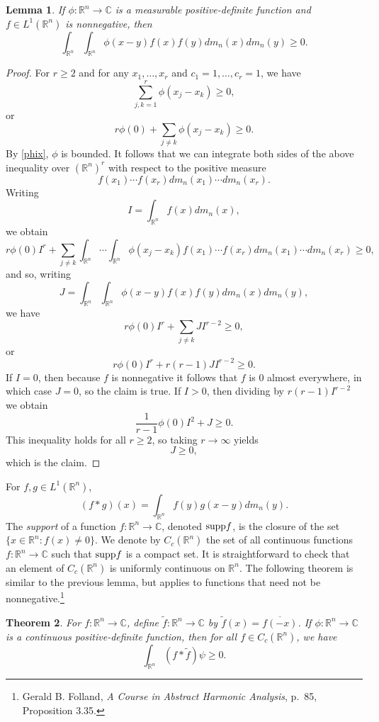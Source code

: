 \documentclass{article}
\newcommand{\supp}{\ensuremath\mathrm{supp}}
\newtheorem{theorem}{Theorem}
\newtheorem{lemma}[theorem]{Lemma}
\theoremstyle{definition}
\begin{document}
\begin{lemma}
If $\phi:\mathbb{R}^n \to \mathbb{C}$ is a measurable positive-definite function and $f \in L^1(\mathbb{R}^n)$ is nonnegative, then
\[
\int_{\mathbb{R}^n} \int_{\mathbb{R}^n} \phi(x-y) f(x)f(y)dm_n(x)dm_n(y) \geq 0.
\]
\label{rlemma}
\end{lemma}
\begin{proof}
For  $r \geq 2$ and for any $x_1,\ldots,x_r$ and  $c_1=1,\ldots,c_r=1$, we have
\[
\sum_{j,k=1}^r \phi(x_j-x_k) \geq 0,
\]
or
\[
r\phi(0) + \sum_{j \neq k} \phi(x_j-x_k) \geq 0.
\]
By \eqref{phix}, $\phi$ is bounded. It follows that we can integrate both sides of the above inequality over $(\mathbb{R}^n)^r$ with respect to the positive measure
\[
f(x_1)\cdots f(x_r) dm_n(x_1) \cdots dm_n(x_r).
\]
 Writing 
\[
I=\int_{\mathbb{R}^n} f(x) dm_n(x),
\]
we obtain
\[
r\phi(0) I^r  + \sum_{j \neq k} \int_{\mathbb{R}^n} \cdots \int_{\mathbb{R}^n} \phi(x_j-x_k) f(x_1)\cdots
f(x_r) dm_n(x_1)\cdots dm_n(x_r) \geq 0,
\]
and so, writing
\[
J=\int_{\mathbb{R}^n} \int_{\mathbb{R}^n} \phi(x-y) f(x)f(y) dm_n(x)dm_n(y),
\]
we have
\[
r\phi(0)I^r +\sum_{j \neq k} JI^{r-2} \geq 0,
\]
or
\[
r\phi(0)I^r +r(r-1) JI^{r-2} \geq 0.
\]
If $I=0$, then because $f$ is nonnegative it follows that $f$ is $0$ almost everywhere, in which case $J=0$, so the claim is true. If $I>0$, then dividing by $r(r-1) I^{r-2}$ we obtain
\[
\frac{1}{r-1} \phi(0)I^2 +J \geq 0.
\]
This inequality holds for all $r \geq 2$, so taking $r \to \infty$ yields
\[
J \geq 0,
\]
which is the claim.
\end{proof}

For $f,g \in L^1(\mathbb{R}^n)$,
\[
(f*g)(x) = \int_{\mathbb{R}^n} f(y)g(x-y) dm_n(y).
\]
The {\em support} of a function $f:\mathbb{R}^n \to \mathbb{C}$, denoted $\supp f$, is the closure of the set $\{x \in \mathbb{R}^n: f(x) \neq 0\}$.
We denote by $C_c(\mathbb{R}^n)$ the set of all continuous functions $f:\mathbb{R}^n \to \mathbb{C}$ such that
$\supp f$ is a compact set. It is straightforward to check that an element of $C_c(\mathbb{R}^n)$ is uniformly continuous on
$\mathbb{R}^n$. The following theorem is similar to the previous lemma, but applies to functions that need not be
nonnegative.\footnote{Gerald B. Folland, {\em A Course in Abstract Harmonic Analysis}, p.~85, Proposition 3.35.}

\begin{theorem}
For $f:\mathbb{R}^n \to \mathbb{C}$, define $\widetilde{f}:\mathbb{R}^n \to \mathbb{C}$ by $\widetilde{f}(x)=\overline{f(-x)}$. 
If $\phi:\mathbb{R}^n \to \mathbb{C}$ is a continuous positive-definite function, then for all $f \in C_c(\mathbb{R}^n)$, we have
\[
\int_{\mathbb{R}^n} (f*\widetilde{f})\psi \geq 0.
\]
\label{integralinequality}
\end{theorem}
\end{document}
